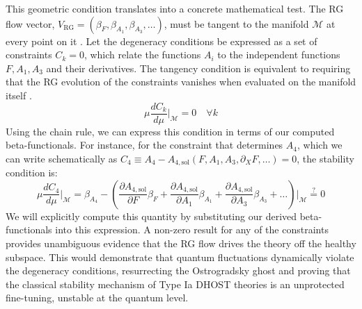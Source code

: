 \documentclass[twocolumn]{aastex631}
\begin{document}
This geometric condition translates into a concrete mathematical test. The RG flow vector, $V_{\text{RG}} = (\beta_F, \beta_{A_1}, \beta_{A_3}, \dots)$, must be tangent to the manifold $\mathcal{M}$ at every point on it \citep{bakas2007renormalizationgroupequationsgeometric,jackson2013geometricrgflow}. Let the degeneracy conditions be expressed as a set of constraints $C_k = 0$, which relate the functions $A_i$ to the independent functions $F, A_1, A_3$ and their derivatives. The tangency condition is equivalent to requiring that the RG evolution of the constraints vanishes when evaluated on the manifold itself \citep{jackson2013geometricrgflow}.
\begin{equation}\mu \frac{dC_k}{d\mu} \bigg|_{\mathcal{M}} = 0 \quad \forall k\end{equation}
Using the chain rule, we can express this condition in terms of our computed beta-functionals. For instance, for the constraint that determines $A_4$, which we can write schematically as $C_4 \equiv A_4 - A_{4,\text{sol}}(F, A_1, A_3, \partial_X F, \dots) = 0$, the stability condition is:
\begin{equation}\mu \frac{dC_4}{d\mu} \bigg|_{\mathcal{M}} = \beta_{A_4} - \left( \frac{\partial A_{4,\text{sol}}}{\partial F}\beta_F + \frac{\partial A_{4,\text{sol}}}{\partial A_1}\beta_{A_1} + \frac{\partial A_{4,\text{sol}}}{\partial A_3}\beta_{A_3} + \dots \right) \bigg|_{\mathcal{M}} \stackrel{?}{=} 0\end{equation}
We will explicitly compute this quantity by substituting our derived beta-functionals into this expression. A non-zero result for any of the constraints provides unambiguous evidence that the RG flow drives the theory off the healthy subspace. This would demonstrate that quantum fluctuations dynamically violate the degeneracy conditions, resurrecting the Ostrogradsky ghost and proving that the classical stability mechanism of Type Ia DHOST theories is an unprotected fine-tuning, unstable at the quantum level.
\end{document}
